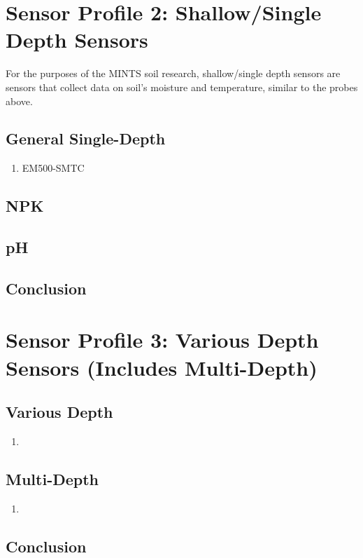 \documentclass{article}
\begin{document}
\section{Sensor Profile 2: Shallow/Single Depth Sensors}
For the purposes of the MINTS soil research, shallow/single depth sensors are sensors that collect data on soil's moisture and temperature, similar to the probes above.  %

\subsection{General Single-Depth}
\begin{enumerate}
\item EM500-SMTC
\end{enumerate}

\subsection{NPK}

\subsection{pH}

\subsection{Conclusion}

\section{Sensor Profile 3: Various Depth Sensors (Includes Multi-Depth)}

\subsection{Various Depth}
\begin{enumerate}
\item 
\end{enumerate}

\subsection{Multi-Depth}
\begin{enumerate}
\item
\end{enumerate}

\subsection{Conclusion}
\end{document}

